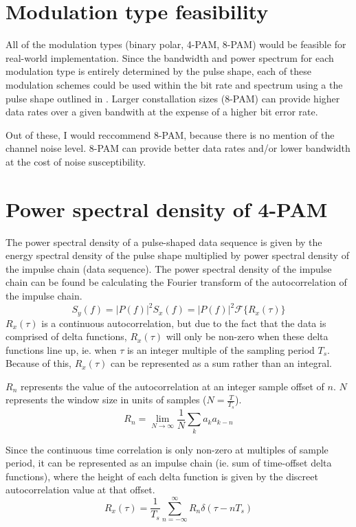 \documentclass[11pt]{article}
\begin{document}

\newpage
\section{Modulation type feasibility}
All of the modulation types (binary polar, 4-PAM, 8-PAM) would be feasible for
real-world implementation. Since the bandwidth and power spectrum for each
modulation type is entirely determined by the pulse shape, each of these
modulation schemes could be used within the bit rate and spectrum using a the
pulse shape outlined in . Larger constallation sizes (8-PAM)
can provide higher data rates over a given bandwith at the expense of a higher
bit error rate.

Out of these, I would reccommend 8-PAM, because there is no mention of the
channel noise level. 8-PAM can provide better data rates and/or lower bandwidth
at the cost of noise susceptibility.

\section{Power spectral density of 4-PAM}\label{rect_psd_section}
The power spectral density of a pulse-shaped data sequence is given by the
energy spectral density of the pulse shape multiplied by power spectral density
of the impulse chain (data sequence). The power spectral density of the impulse
chain can be found be calculating the Fourier transform of the autocorrelation
of the impulse chain.
\begin{equation}
    S_y(f) = |P(f)|^2S_x(f) = |P(f)|^2 \mathcal{F} \{ R_x(\tau) \}
\end{equation}
$R_x(\tau)$ is a continuous autocorrelation, but due to the fact that the data
is comprised of delta functions, $R_x(\tau)$ will only be non-zero when these
delta functions line up, ie. when $\tau$ is an integer multiple of the sampling
period $T_s$. Because of this, $R_x(\tau)$ can be represented as a sum rather
than an integral.

$R_n$ represents the value of the autocorrelation at an integer sample offset of
$n$. $N$ represents the window size in units of samples ($N = \frac{T}{T_s}$).
\begin{equation}\label{rn}
    R_n = \lim_{N \to \infty}  \frac{1}{N} \sum_{k} a_k a_{k-n}
\end{equation}

Since the continuous time correlation is only non-zero at multiples of sample
period, it can be represented as an impulse chain (ie. sum of time-offset delta
functions), where the height of each delta function is given by the discreet
autocorrelation value at that offset.
\begin{equation}\label{autocorr}
    R_x(\tau) = \frac{1}{T_s} \sum_{n=-\infty}^{\infty} R_n \delta(\tau - nT_s)
\end{equation}
\end{document}
